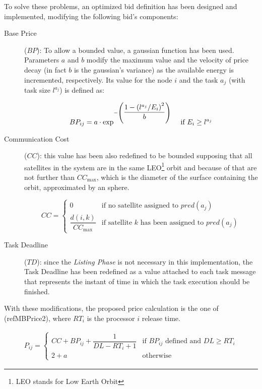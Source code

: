 To solve these problems, an optimized bid definition has been designed and implemented, modifying the following bid's components:

\begin{description}
\item[Base Price] ($ BP $): To allow a bounded value, a gaussian function has been used. Parameters $a$ and $b$ modify the maximum value and the velocity of price decay (in fact $b$ is the gaussian's variance) as the available energy is incremented, respectively. Its value for the node $i$ and the task $a_j$ (with task size $l^{a_{j}}$) is defined as:

\begin{equation}
BP_{ij} = a\cdot \mathrm{exp}^{-\left(\dfrac{1-\left(l^{a_{j}} / E_i\right)^2}{b}\right)}\text{ \quad if } E_i \geq l^{a_{j}}
\end{equation}

\item[Communication Cost] ($ CC $): this value has been also redefined to be bounded supposing that all satellites in the system are in the same LEO\footnote{LEO stands for Low Earth Orbit} orbit and because of that are not further than $CC_{\text{max}}$, which is the diameter of the surface containing the orbit, approximated by an sphere.

\begin{equation}
CC = \begin{cases} 0 & \text{if no satellite assigned to }pred(a_j)\\
\dfrac{d(i,k)}{CC_{\text{max}}} & \text{if satellite } k \text{ has been assigned to }pred(a_j)\end{cases}
\end{equation}

\item[Task Deadline] ($ TD $): since the \emph{Listing Phase} is not necessary in this implementation, the Task Deadline has been redefined as a value attached to each task message that represents the instant of time in which the task execution should be finished.
\end{description}

With these modifications, the proposed price calculation is the one of (ref{MBPrice2}), where $RT_i$ is the processor $i$ release time.

\begin{eqnarray}
\label{MBPrice2}
P_{ij} = \begin{cases}CC + BP_{ij} + \dfrac{1}{DL - RT_i + 1} & \text{if } BP_{ij} \text{ defined and } DL \geq RT_i\\
2 + a & \text{otherwise}\end{cases}
\end{eqnarray}

